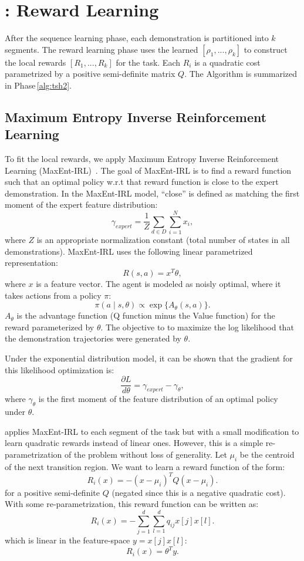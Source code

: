
\section*{\hirl: Reward Learning}\label{sec:reward}
After the sequence learning phase, each demonstration is partitioned into $k$ segments.
The reward learning phase uses the learned $[\rho_1,...,\rho_k]$ to construct the local rewards $[R_1,...,R_k]$ for the task.
Each $R_i$ is a quadratic cost parametrized by a positive semi-definite matrix $Q$.
The Algorithm is summarized in Phase\,\ref{alg:tsh2}.


\subsection{Maximum Entropy Inverse Reinforcement Learning}
To fit the local rewards, we apply Maximum Entropy Inverse Reinforcement Learning (MaxEnt-IRL)~\cite{DBLP:conf/aaai/ZiebartMBD08}. 
The goal of MaxEnt-IRL is to find a reward function such that an optimal policy w.r.t that reward function is close to the
expert demonstration.
In the MaxEnt-IRL model, ``close'' is defined as matching the first moment of the expert feature distribution:
\[
\gamma_{expert} = \frac{1}{Z} \sum_{d \in D} \sum_{i=1}^N x_i,
\]
where $Z$ is an appropriate normalization constant (total number of states in all demonstrations).
MaxEnt-IRL uses the following linear parametrized representation:
\[
R(s,a) = x^T \theta,
\]
where $x$ is a feature vector.
The agent is modeled as noisly optimal, where it takes actions from a policy $\pi$:
\[
\pi(a \mid s, \theta) \propto \exp\{A_\theta(s,a)\}.
\]
$A_\theta$ is the advantage function (Q function minus the Value function) for the reward parameterized by $\theta$.
The objective to to maximize the log likelihood that the demonstration trajectories were generated by  $\theta$.

Under the exponential distribution model, it can be shown that the gradient for this likelihood optimization is:
\[
\frac{\partial L}{d \theta} = \gamma_{expert} - \gamma_{\theta},
\]
where $\gamma_{\theta}$ is the first moment of the feature distribution of an optimal policy under $\theta$.

\hirl applies MaxEnt-IRL to each segment of the task but with a small modification to learn quadratic rewards instead of linear ones. However, this is a simple re-parametrization of the problem without loss of generality.
Let $\mu_i$ be the centroid of the next transition region.
We want to learn a reward function of the form:
\[
R_i(x) = -(x-\mu_i)^T Q (x-\mu_i).
\]
for a positive semi-definite $Q$ (negated since this is a negative quadratic cost).
With some re-parametrization, this reward function can be written as:
\[
R_i(x) = -\sum_{j=1}^d \sum_{l=1}^d q_{ij} x[j] x[l].
\]
which is linear in the feature-space $y = x[j] x[l]$:
\[
R_i(x) = \theta^T y.
\]

